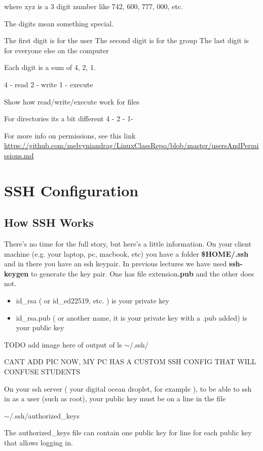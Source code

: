 \documentclass[12pt]{article}
\begin{document}
where xyz is a 3 digit number like 742, 600, 777, 000, etc.

The digits mean something special.

The first digit is for the user
The second digit is for the group
The last digit is for everyone else on the computer

Each digit is a sum of 4, 2, 1. 

4 - read
2 - write
1 - execute

Show how read/write/execute work for files

For directories its a bit different
4 - 
2 - 
1- 

For more info on permissions, see this link
\url{https://github.com/melvyniandrag/LinuxClassRepo/blob/master/usersAndPermissions.md}

\section{SSH Configuration}
\subsection{How SSH Works}
There's no time for the full story, but here's a little information. On your client machine (e.g. your laptop, pc, macbook, etc) you have a folder \textbf{\$HOME/.ssh} and in there you have an ssh keypair. In previous lectures we have used \textbf{ssh-keygen} to generate the key pair. One has file extension\textbf{.pub} and the other does not.

\begin{itemize}
\item id\_rsa ( or id\_ed22519, etc. ) is your private key
\item id\_rsa.pub ( or another name, it is your private key with a .pub added) is your public key
\end{itemize}

TODO add image here of output of ls $\sim$/.ssh/

CANT ADD PIC NOW, MY PC HAS A CUSTOM SSH CONFIG THAT WILL CONFUSE STUDENTS

On your ssh server ( your digital ocean droplet, for example ), to be able to ssh in as a user (such as root), your public key must be on a line in the file

$\sim$/.ssh/authorized\_keys

The authorized\_keys file can contain one public key for line for each public key that allows logging in.
\end{document}
